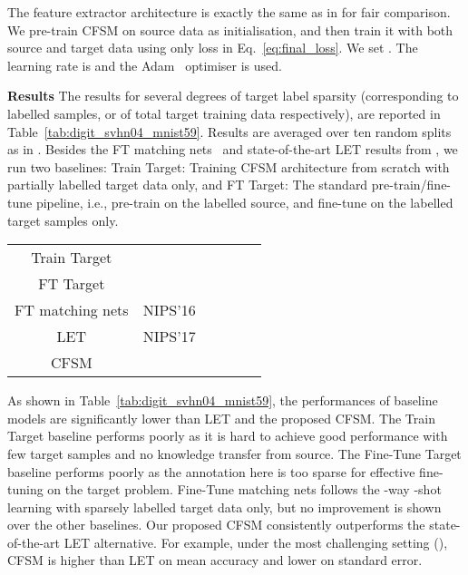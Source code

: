 \documentclass[letterpaper]{article} \usepackage{aaai19}  \usepackage{times}  \usepackage{helvet}  \usepackage{courier}  \usepackage{url}  \usepackage{graphicx}
\newcommand{\keypoint}[1]{\noindent\textbf{#1}\quad}
\newcommand{\cut}[1]{}
\begin{document}
The feature extractor architecture  is exactly the same as in \cite{label_eff_open_da_2017} for fair comparison. \cut{The labelled and unlabelled data are subject to no other losses than those in  Eq.~\ref{eq:final_loss}.} We pre-train CFSM on source data as initialisation, and then train it with both source and target data using only loss in Eq.~\ref{eq:final_loss}. We set . The learning rate is  and the Adam~\cite{kingma2014adam} optimiser is used.

\keypoint{Results}
The results for several degrees of target label sparsity  (corresponding to  labelled samples, or  of total target training data respectively), are reported in Table~\ref{tab:digit_svhn04_mnist59}. Results are averaged over ten random splits as in \cite{label_eff_open_da_2017}. Besides the FT matching nets~\cite{vinyals2016matching} and state-of-the-art LET results from \cite{label_eff_open_da_2017}, we run two baselines: Train Target: Training CFSM architecture from scratch with partially labelled target data only, and FT Target: The standard pre-train/fine-tune pipeline, i.e., pre-train on the labelled source, and fine-tune on the labelled target samples only.

\begin{table*}[!htb]
\centering
\small
\begin{tabular}{cc|c|c|c|c}
\hline
             & &   &  &  &  \\ \hline
Train Target & &   &    &    &    \\
FT Target    & &   &    &    &    \\
FT matching nets & NIPS'16 &  &  &  &  \\
LET  & NIPS'17 &       &      &       &       \\ \hline
CFSM          & &     &    &    &    \\ \hline
\end{tabular}
\caption{Semi-supervised DLSTL image categorisation results (\%), with mean classification accuracy and standard error for SVHN (0-4)  MNIST (5-9).}
\label{tab:digit_svhn04_mnist59}
\end{table*}

As shown in Table~\ref{tab:digit_svhn04_mnist59}, the performances of baseline models are significantly lower than LET and the proposed CFSM. The Train Target baseline performs poorly as it is hard to achieve good performance with few target samples and no knowledge transfer from source. The Fine-Tune Target baseline performs poorly as the annotation here is too sparse for effective fine-tuning on the target problem. 
Fine-Tune matching nets follows the -way -shot learning with sparsely labelled target data only, but no improvement is shown over the other baselines.
Our proposed CFSM consistently outperforms the state-of-the-art LET alternative. For example, under the most challenging setting (), CFSM is  higher than LET on mean accuracy and  lower on standard error.
\end{document}
